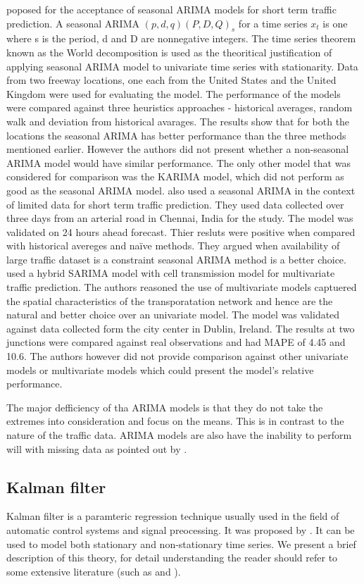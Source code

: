 \citet{williams2003modeling} poposed for the acceptance of seasonal ARIMA models for short term
traffic prediction. A seasonal ARIMA $(p,d,q) (P,D,Q)_{s}$ for a time series {$x_{t}$} is one
where s is the period, d and D are nonnegative integers. The time series theorem known as the World
decomposition is used as the theoritical justification of applying seasonal ARIMA model to
univariate time series with stationarity. Data from two freeway locations, one each from the
United States and the United Kingdom were used for evaluating the model. The performance of the
models were compared against three heuristics approaches - historical averages, random walk and
deviation from historical avarages. The results show that for both the locations the seasonal
ARIMA has better performance than the three methods mentioned earlier. However the authors did
not present whether a non-seasonal ARIMA model would have similar performance. The only other
model that was considered for comparison was the KARIMA model, which did not perform as good as
the seasonal ARIMA model. \citet{kumar2015short} also used a seasonal ARIMA in the context of
limited data for short term traffic prediction. They used data collected over three days from an
arterial road in Chennai, India for the study. The model was validated on 24 hours ahead forecast.
Thier resluts were positive when compared with historical avereges and naïve methods. They
argued when availability of large traffic dataset is a constraint seasonal ARIMA method is a
better choice. \citet{szeto2009multivariate} used a hybrid SARIMA model with cell transmission
model for multivariate traffic prediction. The authors reasoned the use of multivariate models
captuered the spatial characteristics of the transporatation network and hence are the natural
and better choice over an univariate model. The model was validated against data collected form
the city center in Dublin, Ireland. The results at two junctions were compared against real
observations and had MAPE of 4.45 and 10.6. The authors however did not provide comparison
against other univariate models or multivariate models which could present the model's relative
performance.

The major defficiency of tha ARIMA models is that they do not take the extremes into
consideration and focus on the means. This is in contrast to the nature of the traffic data.
ARIMA models are also have the inability to perform will with missing data as pointed out by
\citet{smith1997traffic}.


\subsection{Kalman filter}
Kalman filter is a paramteric regression technique usually used in the field of automatic control
systems and signal preocessing. It was proposed by \citet{kalman1960new}. It can be used to model
both stationary and non-stationary time series. We present a brief description of this theory, for
detail understanding the reader should refer to some extensive literature (such as
\citet{harvey1990forecasting}  and \citet{haykin2001kalman}).


